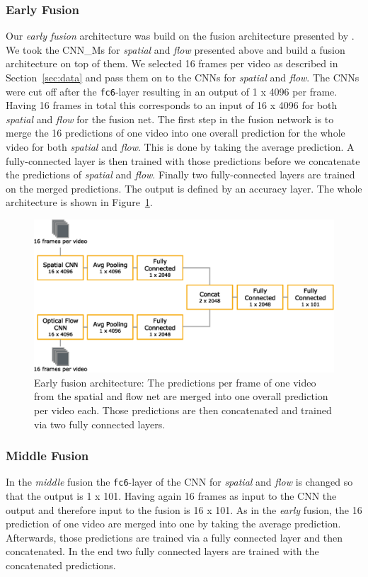 \subsubsection{Early Fusion}
Our \emph{early fusion} architecture was build on the fusion architecture presented by .
We took the CNN\_Ms for \emph{spatial} and \emph{flow} presented above and build a fusion architecture on top of them.
We selected 16 frames per video as described in Section~\ref{sec:data} and pass them on to the CNNs for \emph{spatial} and \emph{flow}.
The CNNs were cut off after the \texttt{fc6}-layer resulting in an output of 1 x 4096 per frame.
Having 16 frames in total this corresponds to an input of 16 x 4096 for both \emph{spatial} and \emph{flow} for the fusion net.
The first step in the fusion network is to merge the 16 predictions of one video into one overall prediction for the whole video for both \emph{spatial} and \emph{flow}.
This is done by taking the average prediction.
A fully-connected layer is then trained with those predictions before we concatenate the predictions of \emph{spatial} and \emph{flow}.
Finally two fully-connected layers are trained on the merged predictions.
The output is defined by an accuracy layer.
The whole architecture is shown in Figure~\ref{fig:early_fusion}.

\begin{figure}[!htb]
	\centering
	\includegraphics[scale=.7]{images/early_fusion.eps}
	\caption{Early fusion architecture: The predictions per frame of one video from the spatial and flow net are merged into one overall prediction per video each. Those predictions are then concatenated and trained via two fully connected layers.}
	\label{fig:early_fusion}
\end{figure}

\subsubsection{Middle Fusion}
In the \emph{middle} fusion the \texttt{fc6}-layer of the CNN for \emph{spatial} and \emph{flow} is changed so that the output is 1 x 101.
Having again 16 frames as input to the CNN the output and therefore input to the fusion is 16 x 101.
As in the \emph{early} fusion, the 16 prediction of one video are merged into one by taking the average prediction.
Afterwards, those predictions are trained via a fully connected layer and then concatenated.
In the end two fully connected layers are trained with the concatenated predictions.

